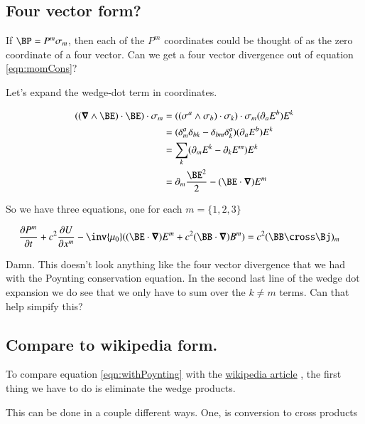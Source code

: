 \documentclass{article}
\begin{document}
\subsection{ Four vector form? }

If $\BP = P^m \sigma_m$, then each of the $P^m$ coordinates could be thought of as the zero coordinate of a four vector.  Can we get a four vector
divergence out of equation \ref{eqn:momCons}?

Let's expand the wedge-dot term in coordinates.

\begin{align*}
( (\spacegrad \wedge \BE ) \cdot \BE ) \cdot \sigma_m
&= ((\sigma^a \wedge \sigma_b) \cdot \sigma_k ) \cdot \sigma_m (\partial_a E^b) E^k \\
&= (\delta^a_m \delta_{bk} - \delta_{bm} \delta^a_k) (\partial_a E^b) E^k \\
&= \sum_k (\partial_m E^k - \partial_k E^m) E^k \\
&= \partial_m \frac{\BE^2}{2} - (\BE \cdot \spacegrad) E^m \\
\end{align*}

So we have three equations, one for each $m = \{1,2,3\}$

\begin{align}\label{eqn:coordinates}
\PD{t}{P^m} + c^2 \PD{x^m}{U} - \inv{\mu_0}( (\BE \cdot \spacegrad) E^m + c^2 (\BB \cdot \spacegrad) B^m ) &= c^2 (\BB \cross \Bj)_m
\end{align}

Damn.  This doesn't look anything like the four vector divergence that we had with the Poynting conservation equation.  In the second last line
of the wedge dot expansion we do see that we only have to sum over the $k \ne m$ terms.  Can that help simpify this?

\subsection{ Compare to wikipedia form. }

To compare equation \ref{eqn:withPoynting} with the
\href{http://en.wikipedia.org/wiki/Electromagnetic_stress-energy_tensor#Conservation_laws}{wikipedia article}
, the first thing we have to do is eliminate the wedge
products.

This can be done in a couple different ways.  One, is conversion to cross products
\end{document}
